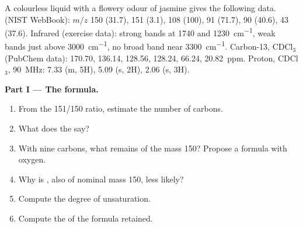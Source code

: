 \begin{problem}
\label{pb:b2:structure-determination:1}
A colourless liquid with a flowery odour of jasmine gives the following data.  (NIST
WebBook): $m/z$ 150 (31.7), 151 (3.1), 108 (100), 91 (71.7), 90 (40.6), 43 (37.6). Infrared (exercise
data): strong bands at 1740 and \qty{1230}{cm^{-1}}, weak bands just above \qty{3000}{cm^{-1}}, no
broad band near \qty{3300}{cm^{-1}}. Carbon-13, CDCl$_3$ (PubChem data): 170.70, 136.14, 128.56,
128.24, 66.24, 20.82~ppm. Proton, CDCl$_3$, \qty{90}{MHz}: 7.33 (m, 5H), 5.09 (s, 2H), 2.06 (s, 3H).

\begin{center}
\end{center}

\medskip
\noindent\textbf{Part I --- The formula.}
\begin{enumerate}
  \item From the 151/150 ratio, estimate the number of carbons.
  \item What does the  say?
  \item With nine carbons, what remains of the mass 150? Propose a formula with oxygen.
  \item Why is , also of nominal mass 150, less likely?
  \item Compute the degree of unsaturation.
  \item Compute the  of the formula retained.
\end{enumerate}


\end{problem}
